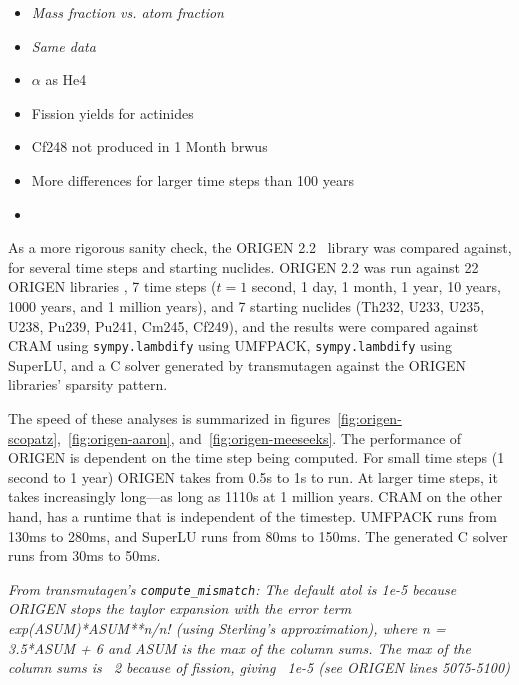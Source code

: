 \begin{itemize}
\item \it{Mass fraction vs. atom fraction}
\item {\it Same data}
\item $\alpha$ as He4
\item Fission yields for actinides
\item Cf248 not produced in 1 Month brwus
\item More differences for larger time steps than 100 years
\item {}
\end{itemize}

As a more rigorous sanity check, the ORIGEN 2.2~\cite{ationneeded} library was
compared against, for several time steps and starting nuclides. ORIGEN 2.2 was
run against 22 ORIGEN libraries , 7 time steps
($t= 1$ second, 1 day, 1 month, 1 year, 10 years, 1000 years, and 1 million
years), and 7 starting nuclides (Th232, U233, U235, U238, Pu239, Pu241, Cm245,
Cf249), and the results were compared against CRAM using
\texttt{sympy.\allowbreak{}lambdify} using UMFPACK,
\texttt{sympy.\allowbreak{}lambdify} using SuperLU, and a C solver generated
by transmutagen against the ORIGEN libraries' sparsity pattern.

 The speed of these analyses is summarized in
figures~\ref{fig:origen-scopatz},~\ref{fig:origen-aaron},
and~\ref{fig:origen-meeseeks}. The performance of ORIGEN is dependent on the
time step being computed. For small time steps (1 second to 1 year) ORIGEN
takes from 0.5\;s to 1\;s to run. At larger time steps, it takes increasingly
long---as long as 1110\;s at 1 million years. CRAM on the other hand, has a
runtime that is independent of the timestep. UMFPACK runs from 130\;ms to
280\;ms, and SuperLU runs from 80\;ms to 150\;ms. The generated C solver runs
from 30\;ms to 50\;ms. 

\it{From transmutagen's \texttt{compute\_mismatch}:}
The default atol is 1e-5 because ORIGEN stops the taylor expansion with
the error term exp(ASUM)*ASUM**n/n! (using Sterling's approximation),
where n = 3.5*ASUM + 6 and ASUM is the max of the column sums. The max of
the column sums is ~2 because of fission, giving ~1e-5 (see ORIGEN lines
5075-5100)


